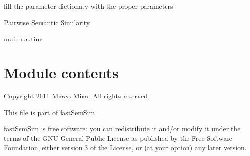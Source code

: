 \documentclass[letterpaper,10pt,english]{sphinxmanual}
\begin{document}

\begin{fulllineitems}
\label{fastsemsim:fastsemsim.fastsemsim_cmdline.set_parameters}
fill the parameter dictionary with the proper parameters

\end{fulllineitems}


\begin{fulllineitems}
\label{fastsemsim:fastsemsim.fastsemsim_cmdline.ss_pairs}
Pairwise Semantic Similarity

\end{fulllineitems}


\begin{fulllineitems}
\label{fastsemsim:fastsemsim.fastsemsim_cmdline.ss_pairwise}
\end{fulllineitems}


\begin{fulllineitems}
\label{fastsemsim:fastsemsim.fastsemsim_cmdline.start}
main routine

\end{fulllineitems}



\section{Module contents}
\label{fastsemsim:module-fastsemsim}\label{fastsemsim:module-contents}
Copyright 2011 Marco Mina. All rights reserved.

This file is part of fastSemSim

fastSemSim is free software: you can redistribute it and/or modify
it under the terms of the GNU General Public License as published by
the Free Software Foundation, either version 3 of the License, or
(at your option) any later version.
\end{document}
